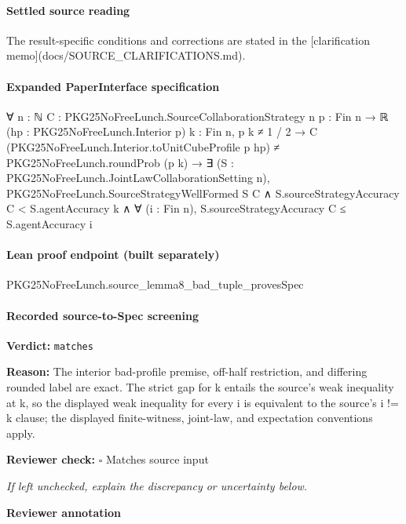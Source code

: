 \documentclass[10pt]{article}
\newcommand{\reviewerbox}{%
  \par\noindent\fbox{\parbox{0.96\linewidth}{\rule{0pt}{0.38in}}}\par
}
\newcommand{\reviewmatch}[1]{%
  \par\noindent\textbf{Reviewer check:} $\square$\; #1\par
  \noindent\emph{If left unchecked, explain the discrepancy or uncertainty below.}\par
}
\begin{document}
\paragraph{Settled source reading}
The result-\allowbreak{}specific conditions and corrections are stated in the [clarification memo](docs/\allowbreak{}SOURCE\_\allowbreak{}CLARIFICATIONS.\allowbreak{}md).\allowbreak{}

\paragraph{Expanded PaperInterface specification}
\begin{ReviewVerbatim}
∀ {n : ℕ} {C : PKG25NoFreeLunch.SourceCollaborationStrategy n} {p : Fin n → ℝ} (hp : PKG25NoFreeLunch.Interior p)
  {k : Fin n},
  p k ≠ 1 / 2 →
    C (PKG25NoFreeLunch.Interior.toUnitCubeProfile p hp) ≠ PKG25NoFreeLunch.roundProb (p k) →
      ∃ (S : PKG25NoFreeLunch.JointLawCollaborationSetting n),
        PKG25NoFreeLunch.SourceStrategyWellFormed S C ∧
          S.sourceStrategyAccuracy C < S.agentAccuracy k ∧ ∀ (i : Fin n), S.sourceStrategyAccuracy C ≤ S.agentAccuracy i
\end{ReviewVerbatim}



\paragraph{Lean proof endpoint (built separately)}\begin{ReviewVerbatim}
PKG25NoFreeLunch.source_lemma8_bad_tuple_provesSpec
\end{ReviewVerbatim}

\paragraph{Recorded source-to-Spec screening}
\textbf{Verdict:} \texttt{matches}
\\
{\raggedright
\textbf{Reason:} The interior bad-\allowbreak{}profile premise, off-\allowbreak{}half restriction, and differing rounded label are exact.\allowbreak{} The strict gap for k entails the source's weak inequality at k, so the displayed weak inequality for every i is equivalent to the source's i != k clause;\allowbreak{} the displayed finite-\allowbreak{}witness, joint-\allowbreak{}law, and expectation conventions apply.\allowbreak{}
\par}
\reviewmatch{Matches source input}
\noindent\textbf{Reviewer annotation}\par
\reviewerbox
\clearpage
\hypertarget{source-claim-1bdd0523bf302431}{}
\end{document}
